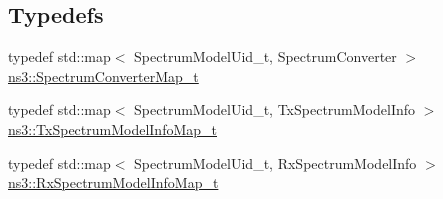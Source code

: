\subsection*{Typedefs}
\begin{DoxyCompactItemize}
\item 
typedef std\+::map$<$ Spectrum\+Model\+Uid\+\_\+t, Spectrum\+Converter $>$ \hyperlink{group__spectrum_ga47089dbfa7f7955f2b2082c1da395450}{ns3\+::\+Spectrum\+Converter\+Map\+\_\+t}
\item 
typedef std\+::map$<$ Spectrum\+Model\+Uid\+\_\+t, Tx\+Spectrum\+Model\+Info $>$ \hyperlink{group__spectrum_ga3b72b7d13697ed8fe482072a7096c289}{ns3\+::\+Tx\+Spectrum\+Model\+Info\+Map\+\_\+t}
\item 
typedef std\+::map$<$ Spectrum\+Model\+Uid\+\_\+t, Rx\+Spectrum\+Model\+Info $>$ \hyperlink{group__spectrum_ga801b24c7ce914a3fc46a57a68bae76ee}{ns3\+::\+Rx\+Spectrum\+Model\+Info\+Map\+\_\+t}
\end{DoxyCompactItemize}
